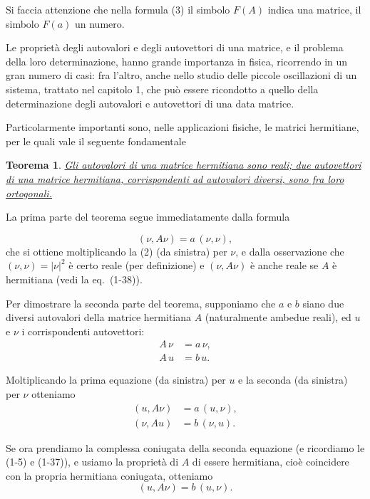 \documentclass[11pt, a4paper]{book}
\numberwithin{equation}{section}
\newtheorem{teorema}{Teorema}[section]
\begin{document}
Si faccia attenzione che nella formula (3) il simbolo $F(A)$ indica una
matrice, il simbolo $F(a)$ un numero.

Le proprietà degli autovalori e degli autovettori di una matrice, e il
problema della loro determinazione, hanno grande importanza in fisica,
ricorrendo in un gran numero di casi: fra l'altro, anche nello studio delle
piccole oscillazioni di un sistema, trattato nel capitolo 1, che può essere
ricondotto a quello della determinazione degli autovalori e autovettori di
una data matrice.

Particolarmente importanti sono, nelle applicazioni fisiche, le matrici
hermitiane, per le quali vale il seguente fondamentale

\begin{teorema}
\uline{Gli autovalori di una matrice hermitiana sono reali; due
autovettori di una matrice hermitiana, corrispondenti ad autovalori diversi,
sono fra loro ortogonali.}
\end{teorema}

La prima parte del teorema segue immediatamente dalla formula


\begin{equation}
(\nu, A\nu) = a\,(\nu, \nu),
\end{equation}
che si ottiene moltiplicando la (2) (da sinistra) per $\nu$, e dalla
osservazione che $(\nu, \nu) = |\nu|^2$ è certo reale (per definizione) e
$(\nu, A\nu)$ è anche reale se $A$ è hermitiana (vedi la eq.\ (1-38)).

Per dimostrare la seconda parte del teorema, supponiamo che $a$ e $b$ siano
due diversi autovalori della matrice hermitiana $A$ (naturalmente ambedue
reali), ed $u$ e $\nu$ i corrispondenti autovettori:
\begin{align}
A\,\nu &= a\,\nu, \label{eq:3.3.5a} \\
A\,u   &= b\,u.  \label{eq:3.3.5b}
\end{align}

Moltiplicando la prima equazione (da sinistra) per $u$ e la seconda (da
sinistra) per $\nu$ otteniamo
\begin{align}
(u, A\nu) &= a\,(u, \nu),  \label{eq:3.3.6a} \\
(\nu, A u) &= b\,(\nu, u). \label{eq:3.3.6b}
\end{align}

Se ora prendiamo la complessa coniugata della seconda equazione (e
ricordiamo le (1-5) e (1-37)), e usiamo la proprietà di $A$ di essere
hermitiana, cioè coincidere con la propria hermitiana coniugata, otteniamo
\begin{equation}
(u, A\nu) = b\,(u, \nu). \label{eq:3.3.6c}
\end{equation}
\end{document}
